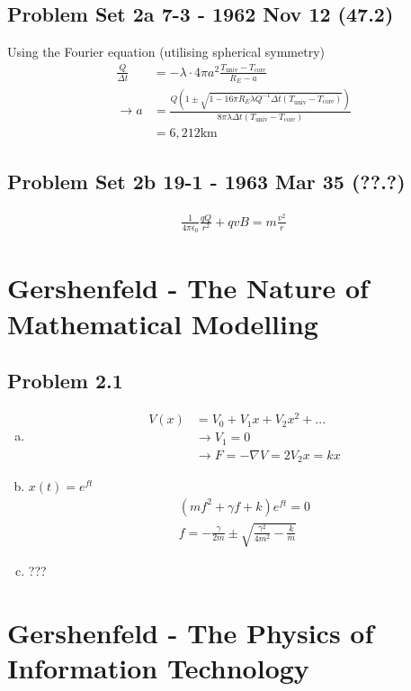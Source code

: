 \documentclass[../main.tex]{subfiles}
\begin{document}
\subsection{Problem Set 2a  7-3 - 1962 Nov 12 (47.2)}
Using the Fourier equation (utilising spherical symmetry)
\begin{align}
\frac{Q}{\Delta t}
&=-\lambda\cdot 4\pi a^2\frac{T_\text{univ}-T_\text{core}}{R_E-a}\\
\rightarrow a
&=\frac{Q\left(1\pm\sqrt{1-16\pi R_E\lambda Q^{-1}\Delta t(T_\text{univ}-T_\text{core})}\right)}{8\pi\lambda\Delta t(T_\text{univ}-T_\text{core})}\\
&=6,212\text{km}
\end{align}


\subsection{Problem Set 2b  19-1 - 1963 Mar 35 (??.?)}
\begin{align}
\frac{1}{4\pi\epsilon_0}\frac{qQ}{r^2}+qvB=m\frac{v^2}{r}
\end{align}

\section{{\sc Gershenfeld} - The Nature of Mathematical Modelling}
\subsection{Problem 2.1}
\begin{enumerate}[(a)]
\item 
\begin{align}
V(x)&=V_0+V_1x+V_2x^2+...\\
&\rightarrow V_1=0\\
&\rightarrow F=-\nabla V=2V_2x=kx
\end{align}
\item $x(t)=e^{ft}$
\begin{align}
(mf^2+\gamma f+k)e^{ft}=0\\
f=-\frac{\gamma}{2m}\pm\sqrt{\frac{\gamma^2}{4m^2}-\frac{k}{m}}
\end{align}
\item ???
\end{enumerate}



\section{{\sc Gershenfeld} - The Physics of Information Technology}
\end{document}
